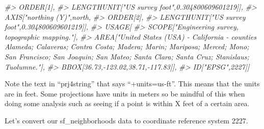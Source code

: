 \documentclass[
]{krantz}
\makeatletter
\newenvironment{Shaded}{\begin{snugshade}}{\end{snugshade}}
\newcommand{\CommentTok}[1]{\textcolor[rgb]{0.37,0.37,0.37}{\textit{#1}}}
\newenvironment{kframe}{%
\medskip{}
\setlength{\fboxsep}{.8em}
 \def\at@end@of@kframe{}%
 \ifinner\ifhmode%
  \def\at@end@of@kframe{\end{minipage}}%
  \begin{minipage}{\columnwidth}%
 \fi\fi%
 \def\FrameCommand##1{\hskip\@totalleftmargin \hskip-\fboxsep
 \colorbox{shadecolor}{##1}\hskip-\fboxsep
     \hskip-\linewidth \hskip-\@totalleftmargin \hskip\columnwidth}%
 \MakeFramed {\advance\hsize-\width
   \@totalleftmargin\z@ \linewidth\hsize
   \@setminipage}}%
 {\par\unskip\endMakeFramed%
 \at@end@of@kframe}
\renewenvironment{Shaded}{\begin{kframe}}{\end{kframe}}
\makeatother
\begin{document}
\begin{Shaded}
\begin{Highlighting}[]
\CommentTok{\#\textgreater{}             ORDER[1],}
\CommentTok{\#\textgreater{}             LENGTHUNIT["US survey foot",0.304800609601219]],}
\CommentTok{\#\textgreater{}         AXIS["northing (Y)",north,}
\CommentTok{\#\textgreater{}             ORDER[2],}
\CommentTok{\#\textgreater{}             LENGTHUNIT["US survey foot",0.304800609601219]],}
\CommentTok{\#\textgreater{}     USAGE[}
\CommentTok{\#\textgreater{}         SCOPE["Engineering survey, topographic mapping."],}
\CommentTok{\#\textgreater{}         AREA["United States (USA) {-} California {-} counties Alameda; Calaveras; Contra Costa; Madera; Marin; Mariposa; Merced; Mono; San Francisco; San Joaquin; San Mateo; Santa Clara; Santa Cruz; Stanislaus; Tuolumne."],}
\CommentTok{\#\textgreater{}         BBOX[36.73,{-}123.02,38.71,{-}117.83]],}
\CommentTok{\#\textgreater{}     ID["EPSG",2227]]}
\end{Highlighting}
\end{Shaded}

Note the text in ``prj4string'' that says ``+units=us-ft''. This means that the units are in feet. Some projections have units in meters so be mindful of this when doing some analysis such as seeing if a point is within X feet of a certain area.

Let's convert our sf\_neighborhoods data to coordinate reference system 2227.
\end{document}
